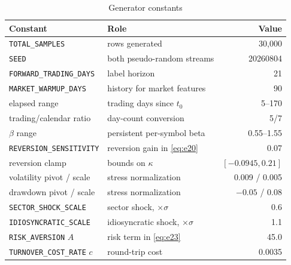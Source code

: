 \begin{table}[t]
\caption{Generator constants}
\label{tab:t4}
\centering
\scriptsize
\setlength{\tabcolsep}{3pt}
\begin{tabular}{@{}llr@{}}
\toprule
Constant & Role & Value \\
\midrule
\texttt{TOTAL\_SAMPLES} & rows generated & 30{,}000 \\
\texttt{SEED} & both pseudo-random streams & 20260804 \\
\texttt{FORWARD\_TRADING\_DAYS} & label horizon & 21 \\
\texttt{MARKET\_WARMUP\_DAYS} & history for market features & 90 \\
elapsed range & trading days since $t_0$ & 5--170 \\
trading/calendar ratio & day-count conversion & 5/7 \\
$\beta$ range & persistent per-symbol beta & 0.55--1.55 \\
\texttt{REVERSION\_SENSITIVITY} & reversion gain in \eqref{eq:e20} & 0.07 \\
reversion clamp & bounds on $\kappa$ & $[-0.0945, 0.21]$ \\
volatility pivot / scale & stress normalization & 0.009 / 0.005 \\
drawdown pivot / scale & stress normalization & $-0.05$ / 0.08 \\
\texttt{SECTOR\_SHOCK\_SCALE} & sector shock, $\times\sigma$ & 0.6 \\
\texttt{IDIOSYNCRATIC\_SCALE} & idiosyncratic shock, $\times\sigma$ & 1.1 \\
\texttt{RISK\_AVERSION} $A$ & risk term in \eqref{eq:e23} & 45.0 \\
\texttt{TURNOVER\_COST\_RATE} $c$ & round-trip cost & 0.0035 \\
\bottomrule
\end{tabular}
\end{table}
